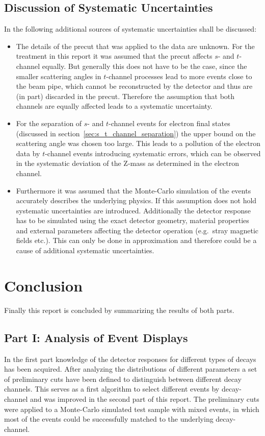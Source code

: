 \documentclass[11pt, a4paper]{article}
\numberwithin{equation}{section}
\begin{document}
\subsection{Discussion of Systematic Uncertainties}
In the following additional sources of systematic uncertainties shall be discussed:
\begin{itemize}
	\item The details of the precut that was applied to the data are unknown.
	For the treatment in this report it was assumed that the precut affects $s$- and $t$-channel equally.
	But generally this does not have to be the case, since the smaller scattering angles in $t$-channel processes lead to more events close to the beam pipe, which cannot be reconstructed by the detector and thus are (in part) discarded in the precut.
	Therefore the assumption that both channels are equally affected leads to a systematic uncertainty.	
	
	\item For the separation of $s$- and $t$-channel events for electron final states (discussed in section~\ref{sec:s_t_channel_separation}) the upper bound on the scattering angle was chosen too large.
	This leads to a pollution of the electron data by $t$-channel events introducing systematic errors, which can be observed in the systematic deviation of the Z-mass as determined in the electron channel.
	
	\item Furthermore it was assumed that the Monte-Carlo simulation of the events accurately describes the underlying physics.
	If this assumption does not hold systematic uncertainties are introduced.
	Additionally the detector response has to be simulated using the exact detector geometry, material properties and external parameters affecting the detector operation (e.g.\ stray magnetic fields etc.).
	This can only be done in approximation and therefore could be a cause of additional systematic uncertainties.
\end{itemize}

\section{Conclusion}
Finally this report is concluded by summarizing the results of both parts.

\subsection{Part I: Analysis of Event Displays}
In the first part knowledge of the detector responses for different types of decays has been acquired.
After analyzing the distributions of different parameters a set of preliminary cuts have been defined to distinguish between different decay channels.
This serves as a first algorithm to select different events by decay-channel and was improved in the second part of this report.
The preliminary cuts were applied to a Monte-Carlo simulated test sample with mixed events, in which most of the events could be successfully matched to the underlying decay-channel.
\end{document}
